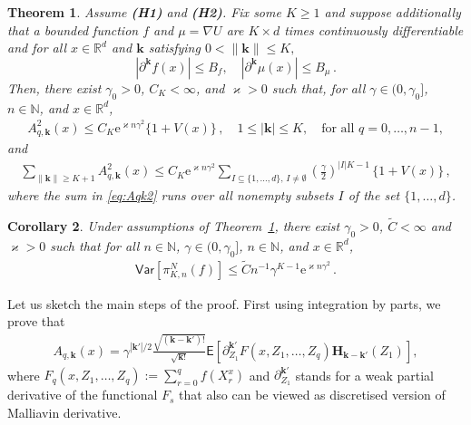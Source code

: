 \documentclass[bj]{imsart}
\def\PVar{\mathsf{Var}}
\def\nset{\mathbb{N}}
\def\rset{\mathbb{R}}
\def\rme{\mathrm{e}}
\def\rset{\mathbb{R}}
\newtheorem{thm}{Theorem}
\newtheorem{cor}[thm]{Corollary}
\def\eqsp{\,}
\begin{document}
\begin{thm}\label{th:mr}
Assume {\bf (H1)} and {\bf (H2)}.
Fix some $K\geq 1$ and suppose additionally that a bounded function $f$ and $\mu=\nabla U$ are $K \times d $ times continuously differentiable
and for all $x\in\mathbb R^d$ and  \(\mathbf{k}\) satisfying \(0<\|\mathbf{k}\|\leq  K,\)
\begin{equation}
\label{eq:smooth-mu}
|\partial^{\mathbf{k}} f(x)|\le  B_f, \quad |\partial^{\mathbf{k}} \mu (x)|\leq B_\mu \eqsp.
\end{equation}
Then, there exist $\gamma_0 > 0$, $C_K < \infty$, and $\varkappa > 0$  such that, for all $\gamma \in (0,\gamma_0]$, $n \in \nset$, and $x \in \rset^d$,
\begin{eqnarray}
\label{eq:Aqk2}
A^2_{q,\mathbf{k}}(x)\leq C_K \rme^{\varkappa n\gamma^2}\{1+V(x)\} \,,\quad 1\leq |\mathbf{k}|\leq K, \quad \text{for all  $q=0,\ldots,n-1,$}
\end{eqnarray}
and
\begin{eqnarray}
\label{eq:Aqk2sum}
\sum_{\|\mathbf{k}\|\geq K+1} A^2_{q,\mathbf{k}}(x)\leq C_{K} \rme^{\varkappa n\gamma^2}\sum_{I\subseteq\{1,\ldots,d\},\, I\neq \emptyset}
\left(\frac{\gamma}{2}\right)^{|I|K-1} \, \{1+V(x)\} \eqsp,
\end{eqnarray}
where the sum in \eqref{eq:Aqk2} runs over all nonempty subsets $I$ of the set $\{1,\ldots,d\}$.
\end{thm}
\begin{cor}
Under assumptions of Theorem~\ref{th:mr}, there exist $\gamma_0 > 0$, $\tilde{C} < \infty$ and $\varkappa > 0$ such that for all $n \in \nset$, $\gamma \in (0,\gamma_0]$, $n\in \nset$, and $x \in \rset^d$,
\begin{eqnarray}
\label{eq:var-bound}
\PVar\left[\pi_{K,n}^{N}(f)\right] \leq \tilde{C}  n^{-1} \gamma^{K-1}  \rme^{\varkappa n\gamma^2}
\eqsp.
\end{eqnarray}
\end{cor}
Let us sketch the main steps of the proof. First using integration by parts, we prove that
\begin{eqnarray}
\label{eq:Ask-part}
A_{q,\mathbf{k}}(x)=\gamma^{|\mathbf{k}'|/2}\frac{\sqrt{(\mathbf{k}-\mathbf{k}')!}}{\sqrt{\mathbf{k}!}}\mathsf{E}\left[ \partial_{Z_1}^{\mathbf{k}'} F(x,Z_1,\ldots,Z_q) \mathbf{H}_{\mathbf{k}-\mathbf{k}'}(Z_{1})\right],
\end{eqnarray}
where $F_q(x,Z_1,\ldots,Z_q):=\sum_{r=0}^q f(X^x_r)$ and $\partial_{Z_1}^{\mathbf{k}'}$
stands for a weak partial derivative of the functional $F_s$ that also can be viewed as discretised version of Malliavin derivative.
\end{document}
